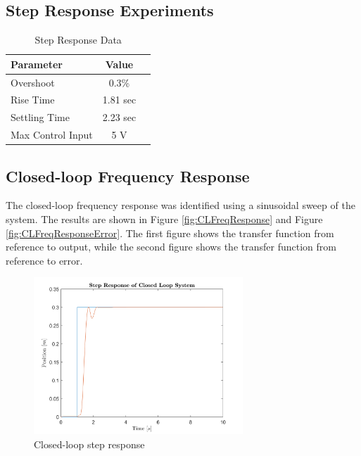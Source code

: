 \documentclass[11pt]{article}
\begin{document}
\subsection{Step Response Experiments}
\begin{table}[h!]
    \centering
    \begin{tabular}{@{}lcc@{}}
    \toprule
    \textbf{Parameter} & \textbf{Value} \\
    \midrule
    Overshoot & 0.3\% \\
    Rise Time & 1.81 sec \\
    Settling Time & 2.23 sec \\
    Max Control Input &  5 V\\
    \bottomrule
    \end{tabular}
    \caption{Step Response Data}
    \label{tab:step_response}
\end{table}
    




\subsection{Closed-loop Frequency Response}
The closed-loop frequency response was identified using a sinusoidal sweep of the system. The results are shown in Figure \ref{fig:CLFreqResponse} and Figure \ref{fig:CLFreqResponseError}. The first figure shows the transfer function from reference to output, while the second figure shows the transfer function from reference to error.

\begin{figure}[!ht]
\centering
\includegraphics[width=0.7\textwidth]{CLStepResponse.png}
\caption{Closed-loop step response}
\label{fig:CLStepResponse}
\end{figure}
\end{document}

